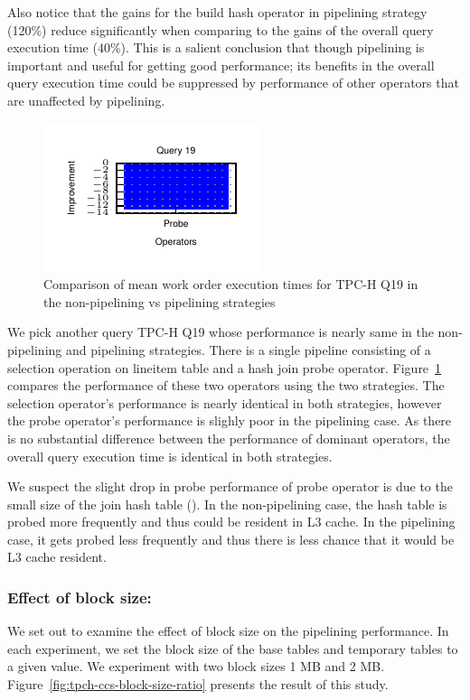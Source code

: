 Also notice that the gains for the build hash operator in pipelining strategy (120\%) reduce significantly when comparing to the gains of the overall query execution time (40\%). 
This is a salient conclusion that though pipelining is important and useful for getting good performance; its
benefits in the overall query execution time could be suppressed by performance of other operators that are unaffected by pipelining.

\begin{figure}
	\centering 
	\includegraphics[width=0.4\textheight]{pipeline/figures/tpch-q19-ccs-20threads-bs2mb-meanwo}
	\caption{Comparison of mean work order execution times for TPC-H Q19 in the non-pipelining vs pipelining strategies}
	\label{fig:tpch-q19-ccs-meanwo}
\end{figure}

We pick another query TPC-H Q19 whose performance is nearly same in the non-pipelining and pipelining strategies. 
There is a single pipeline consisting of a selection operation on lineitem table and a hash join probe operator.
Figure~\ref{fig:tpch-q19-ccs-meanwo} compares the performance of these two operators using the two strategies.
The selection operator's performance is nearly identical in both strategies, however the probe operator's performance is slighly poor in the pipelining case. 
As there is no substantial difference between the performance of dominant operators, the overall query execution time is identical in both strategies.

We suspect the slight drop in probe performance of probe operator is due to the small size of the join hash table (). 
In the non-pipelining case, the hash table is probed more frequently and thus could be resident in L3 cache. 
In the pipelining case, it gets probed less frequently and thus there is less chance that it would be L3 cache resident. 

\subsubsection{Effect of block size:}
We set out to examine the effect of block size on the pipelining performance. 
In each experiment, we set the block size of the base tables and temporary tables to a given value. 
We experiment with two block sizes 1 MB and 2 MB.
Figure~\ref{fig:tpch-ccs-block-size-ratio} presents the result of this study.

